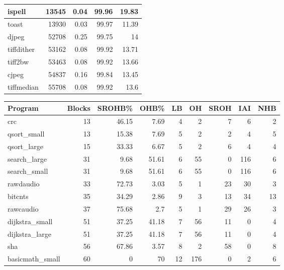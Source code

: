 \begin{tabular}{l|r|r|r|r}
\hline
 ispell          &   13545 &   0.04 &        99.96 &   19.83 \\
\hline
 toast           &   13930 &   0.03 &        99.97 &   11.39 \\
\hline
 djpeg           &   52708 &   0.25 &        99.75 &   14    \\
\hline
 tiffdither      &   53162 &   0.08 &        99.92 &   13.71 \\
\hline
 tiff2bw         &   53463 &   0.08 &        99.92 &   13.66 \\
\hline
 cjpeg           &   54837 &   0.16 &        99.84 &   13.45 \\
\hline
 tiffmedian      &   55708 &   0.08 &        99.92 &   13.6  \\
\hline
\end{tabular}\begin{tabular}{l|r|r|r|r|r|r|r|r}
\hline
 Program         &   Blocks &   SROHB\% &   OHB\% &   LB &   OH &   SROH &   IAI &   NHB \\
\hline
 crc             &       13 &    46.15 &   7.69 &    4 &    2 &      7 &     6 &     2 \\
\hline
 qsort\_small     &       13 &    15.38 &   7.69 &    5 &    2 &      2 &     4 &     5 \\
\hline
 qsort\_large     &       15 &    33.33 &   6.67 &    5 &    2 &      6 &     4 &     4 \\
\hline
 search\_large    &       31 &     9.68 &  51.61 &    6 &   55 &      0 &   116 &     6 \\
\hline
 search\_small    &       31 &     9.68 &  51.61 &    6 &   55 &      0 &   116 &     6 \\
\hline
 rawdaudio       &       33 &    72.73 &   3.03 &    5 &    1 &     23 &    30 &     3 \\
\hline
 bitcnts         &       35 &    34.29 &   2.86 &    9 &    3 &     13 &    34 &    13 \\
\hline
 rawcaudio       &       37 &    75.68 &   2.7  &    5 &    1 &     29 &    26 &     3 \\
\hline
 dijkstra\_small  &       51 &    37.25 &  41.18 &    7 &   56 &     11 &     0 &     4 \\
\hline
 dijkstra\_large  &       51 &    37.25 &  41.18 &    7 &   56 &     11 &     0 &     4 \\
\hline
 sha             &       56 &    67.86 &   3.57 &    8 &    2 &     58 &     0 &     8 \\
\hline
 basicmath\_small &       60 &     0    &  70    &   12 &  176 &      0 &     2 &     6 \\

\end{tabular}
